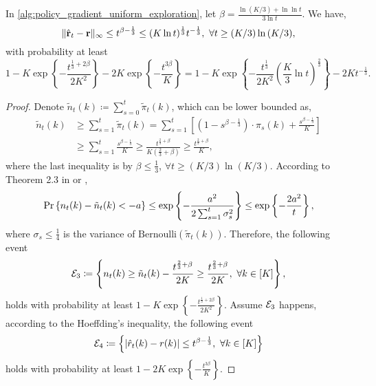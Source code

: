\begin{thm}
\label{thm:reward_estimation_hoeffding}
    In \cref{alg:policy_gradient_uniform_exploration}, let $\beta = \frac{ \ln{(K/3) + \ln{\ln{t}} } }{ 3 \ln{t}}$. We have,
\begin{equation*}
    \| \hat{{\mathbf{r}}}_t - {\mathbf{r}} \|_\infty \le t^{\beta - \frac{1}{3}} \le ( K \ln{t} )^\frac{1}{3} t^{- \frac{1}{3}}, \ \forall t \ge (K/3) \ln{(K/3) },
\end{equation*}
with probability at least
\begin{equation*}
    1 - K \exp\left\{ - \frac{t^{\frac{1}{3} + 2 \beta}}{2 K^2} \right\} - 2 K \exp\left\{ - \frac{t^{3\beta}}{ K } \right\} = 1 - K \exp\left\{ - \frac{t^{\frac{1}{3}}}{2 K^2} \left( \frac{K}{3} \ln{t} \right)^{\frac{2}{3}} \right\} - 2 K t^{- \frac{1}{3}}.
\end{equation*}
\end{thm}
\begin{proof}
    Denote $\tilde{n}_t(k) \coloneqq \sum\limits_{s=0}^{t}{ \tilde{\pi}_t(k)}$, which can be lower bounded as,
\begin{equation*}
\begin{split}
    \tilde{n}_t(k) &\ge \sum\limits_{s=1}^{t}{ \tilde{\pi}_t(k)} = \sum\limits_{s=1}^{t}{ \left[ \left( 1 - s^{\beta - \frac{1}{3}} \right) \cdot \pi_{s}(k) + \frac{s^{\beta - \frac{1}{3}}}{K} \right] } \\
    &\ge \sum\limits_{s=1}^{t}{ \frac{s^{\beta - \frac{1}{3}}}{K} } \ge \frac{t^{\frac{2}{3} + \beta}}{ K  \left(\frac{2}{3} + \beta \right) } \ge \frac{t^{\frac{2}{3} + \beta}}{ K },
\end{split}
\end{equation*}
where the last inequality is by $\beta \le \frac{1}{3}$, $\forall t \ge (K/3) \ln{(K/3) }$. According to Theorem 2.3 in \citet{wainwright2015mathematical} or \citet{wainwright2019high},
\begin{equation*}
\begin{split}
    \operatorname*{Pr}\left\{ n_t(k) - \tilde{n}_t(k) < - a \right\} \le \exp\left\{ - \frac{a^2}{2 \sum_{s=1}^{t}{\sigma_s^2} } \right\} \le \exp\left\{ - \frac{2 a^2}{ t } \right\},
\end{split}
\end{equation*}
where $\sigma_s \le \frac{1}{4}$ is the variance of $\text{Bernoulli}( \tilde{\pi}_t(k))$. Therefore, the following event
\begin{equation*}
    {\mathcal{E}}_3 \coloneqq \left\{ n_t(k) \ge \tilde{n}_t(k) - \frac{t^{\frac{2}{3} + \beta}}{ 2 K } \ge \frac{t^{\frac{2}{3} + \beta}}{ 2 K}, \ \forall k \in [K] \right\},
\end{equation*}
holds with probability at least $1 - K \exp\left\{ -  \frac{t^{\frac{1}{3} + 2 \beta}}{2 K^2} \right\}$. Assume ${\mathcal{E}}_3$ happens, according to the Hoeffding's inequality, the following event
\begin{equation*}
    {\mathcal{E}}_4 \coloneqq \left\{ | \hat{r}_{t}(k) - r(k) | \le t^{\beta - \frac{1}{3}} , \ \forall k \in [K] \right\}
\end{equation*}
holds with probability at least $1 - 2 K \exp\left\{ - \frac{t^{3\beta}}{ K } \right\}$.
\end{proof}

